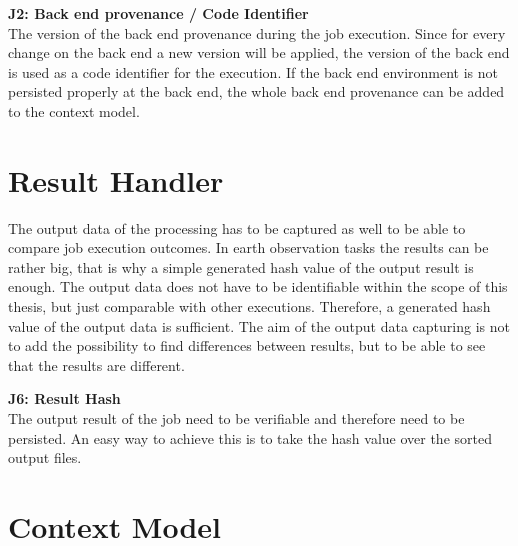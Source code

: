 \documentclass[draft,final]{vutinfth} %
\begin{document}
\textbf{J2: Back end provenance / Code Identifier} \\
The version of the back end provenance during the job execution. Since for every change on the back end a new version will be applied, the version of the back end is used as a code identifier for the execution. If the back end environment is not persisted properly at the back end, the whole back end provenance can be added to the context model.  


\section{Result Handler}\label{Design:Result Handler}
The output data of the processing has to be captured as well to be able to compare job execution outcomes. In earth observation tasks the results can be rather big, that is why a simple generated hash value of the output result is enough. The output data does not have to be identifiable within the scope of this thesis, but just comparable with other executions. Therefore, a generated hash value of the output data is sufficient. The aim of the output data capturing is not to add the possibility to find differences between results, but to be able to see that the results are different. 

\textbf{J6: Result Hash} \\
The output result of the job need to be verifiable and therefore need to be persisted. An easy way to achieve this is to take the hash value over the sorted output files.
 
\section{Context Model}\label{Design:Context Model}
\end{document}
